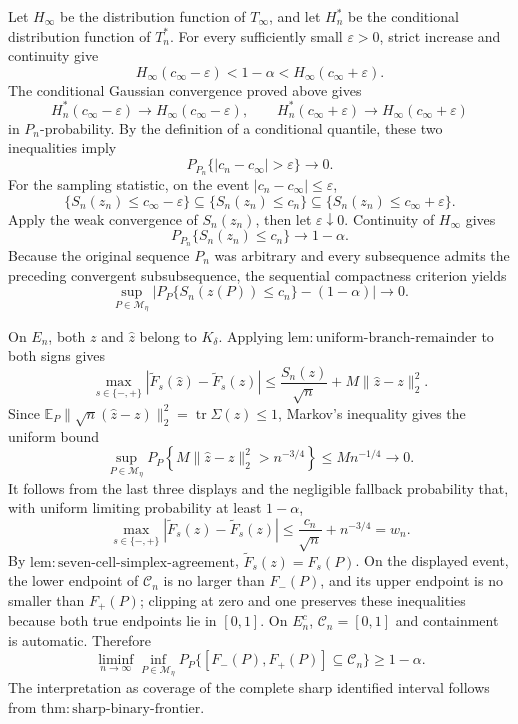 Let \(H_\infty\) be the distribution function of \(T_\infty\), and let \(H_n^*\) be the conditional distribution function of \(T_n^*\).  For every sufficiently small \(\varepsilon>0\), strict increase and continuity give
\[
 H_\infty(c_\infty-\varepsilon)<1-\alpha
 <H_\infty(c_\infty+\varepsilon).
\]
The conditional Gaussian convergence proved above gives
\[
 H_n^*(c_\infty-\varepsilon)\to
 H_\infty(c_\infty-\varepsilon),
 \qquad
 H_n^*(c_\infty+\varepsilon)\to
 H_\infty(c_\infty+\varepsilon)
\]
in \(P_n\)-probability.  By the definition of a conditional quantile, these two inequalities imply
\[
 P_{P_n}\{|c_n-c_\infty|>\varepsilon\}\longrightarrow0.
\]
For the sampling statistic, on the event \(|c_n-c_\infty|\leq\varepsilon\),
\[
 \{S_n(z_n)\leq c_\infty-\varepsilon\}
 \subseteq\{S_n(z_n)\leq c_n\}
 \subseteq\{S_n(z_n)\leq c_\infty+\varepsilon\}.
\]
Apply the weak convergence of \(S_n(z_n)\), then let \(\varepsilon\downarrow0\).  Continuity of \(H_\infty\) gives
\[
P_{P_n}\{S_n(z_n)\leq c_n\}\longrightarrow1-\alpha.
\]
Because the original sequence \(P_n\) was arbitrary and every subsequence admits the preceding convergent subsubsequence, the sequential compactness criterion yields
\[
 \sup_{P\in\mathcal M_\eta}
 \left|P_P\{S_n(z(P))\leq c_n\}-(1-\alpha)\right|
 \longrightarrow0.
\]

On \(E_n\), both \(z\) and \(\widehat z\) belong to \(K_\delta\).  Applying \(\mathrm{lem{:}uniform\text{-}branch\text{-}remainder}\) to both signs gives
\[
 \max_{s\in\{-,+\}}
 \left|\widetilde F_s(\widehat z)-\widetilde F_s(z)\right|
 \leq\frac{S_n(z)}{\sqrt n}+M\|\widehat z-z\|_2^2.
\]
Since \(\mathbb E_P\|\sqrt n(\widehat z-z)\|_2^2=\operatorname{tr}\Sigma(z)\leq1\), Markov's inequality gives the uniform bound
\[
 \sup_{P\in\mathcal M_\eta}
 P_P\!\left\{M\|\widehat z-z\|_2^2>n^{-3/4}\right\}
 \leq M n^{-1/4}\longrightarrow0.
\]
It follows from the last three displays and the negligible fallback probability that, with uniform limiting probability at least \(1-\alpha\),
\[
 \max_{s\in\{-,+\}}
 \left|\widetilde F_s(\widehat z)-\widetilde F_s(z)\right|
 \leq \frac{c_n}{\sqrt n}+n^{-3/4}=w_n.
\]
By \(\mathrm{lem{:}seven\text{-}cell\text{-}simplex\text{-}agreement}\), \(\widetilde F_s(z)=F_s(P)\).  On the displayed event, the lower endpoint of \(\mathcal C_n\) is no larger than \(F_-(P)\), and its upper endpoint is no smaller than \(F_+(P)\); clipping at zero and one preserves these inequalities because both true endpoints lie in \([0,1]\).  On \(E_n^c\), \(\mathcal C_n=[0,1]\) and containment is automatic.  Therefore
\[
 \liminf_{n\to\infty}\inf_{P\in\mathcal M_\eta}
 P_P\{[F_-(P),F_+(P)]\subseteq\mathcal C_n\}
 \geq1-\alpha.
\]
The interpretation as coverage of the complete sharp identified interval follows from \(\mathrm{thm{:}sharp\text{-}binary\text{-}frontier}\).

